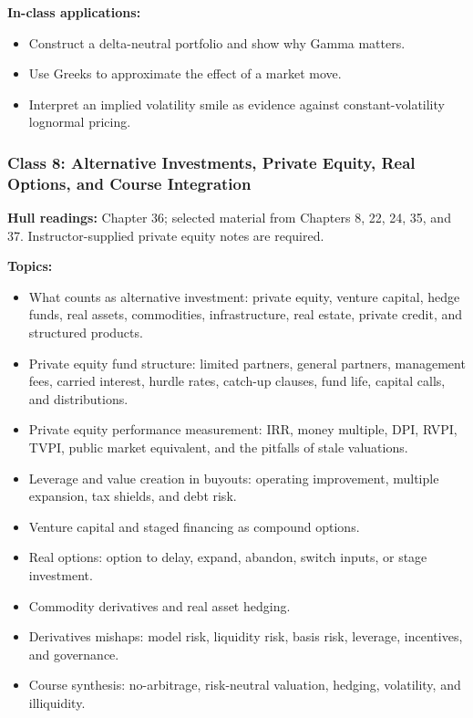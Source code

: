 \documentclass[11pt]{article}
\begin{document}
\textbf{In-class applications:}
\begin{itemize}
    \item Construct a delta-neutral portfolio and show why Gamma matters.
    \item Use Greeks to approximate the effect of a market move.
    \item Interpret an implied volatility smile as evidence against constant-volatility lognormal pricing.
\end{itemize}

\subsubsection*{Class 8: Alternative Investments, Private Equity, Real Options, and Course Integration}
\textbf{Hull readings:} Chapter 36; selected material from Chapters 8, 22, 24, 35, and 37. Instructor-supplied private equity notes are required.

\textbf{Topics:}
\begin{itemize}
    \item What counts as alternative investment: private equity, venture capital, hedge funds, real assets, commodities, infrastructure, real estate, private credit, and structured products.
    \item Private equity fund structure: limited partners, general partners, management fees, carried interest, hurdle rates, catch-up clauses, fund life, capital calls, and distributions.
    \item Private equity performance measurement: IRR, money multiple, DPI, RVPI, TVPI, public market equivalent, and the pitfalls of stale valuations.
    \item Leverage and value creation in buyouts: operating improvement, multiple expansion, tax shields, and debt risk.
    \item Venture capital and staged financing as compound options.
    \item Real options: option to delay, expand, abandon, switch inputs, or stage investment.
    \item Commodity derivatives and real asset hedging.
    \item Derivatives mishaps: model risk, liquidity risk, basis risk, leverage, incentives, and governance.
    \item Course synthesis: no-arbitrage, risk-neutral valuation, hedging, volatility, and illiquidity.
\end{itemize}
\end{document}
